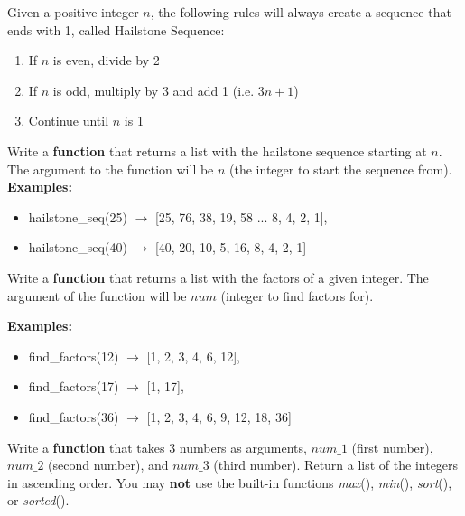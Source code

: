 




	\item 
		Given a positive integer $n$, the following rules will always create a sequence that 
		ends with 1, called Hailstone Sequence:
		\begin{enumerate}
			\item If $n$ is even, divide by 2
			\item If $n$ is odd, multiply by 3 and add 1 (i.e. $3n+1$)
			\item Continue until $n$ is 1
		\end{enumerate}
		Write a \textbf{function} that returns a list with the hailstone sequence starting at $n$. 
		The argument to the function will be $n$ (the integer to start the sequence from).
		\textbf{Examples:}		
		\begin{itemize}
			\item  hailstone\_seq(25) $\rightarrow$ [25, 76, 38, 19, 58 ... 8, 4, 2, 1], 
			\item  hailstone\_seq(40) $\rightarrow$ [40, 20, 10, 5, 16, 8, 4, 2, 1]
		\end{itemize}



	\item 
		Write a \textbf{function} that returns a list with the factors of a given integer. The argument of the function
		will be $num$ (integer to find factors for).

		\textbf{Examples:}		
		\begin{itemize}
			\item  find\_factors(12) $\rightarrow$ [1, 2, 3, 4, 6, 12], 
			\item  find\_factors(17) $\rightarrow$ [1, 17],
			\item  find\_factors(36) $\rightarrow$ [1, 2, 3, 4, 6, 9, 12, 18, 36]
		\end{itemize}



	\item
		Write a \textbf{function} that takes 3 numbers as arguments, $num\_1$ (first number), 
		$num\_2$ (second number), and $num\_3$ (third number). 
		Return a list of the integers in ascending order. 
		You may \textbf{not} use the built-in functions \textit{max}(), \textit{min}(), 
		\textit{sort}(), or \textit{sorted}().
		
